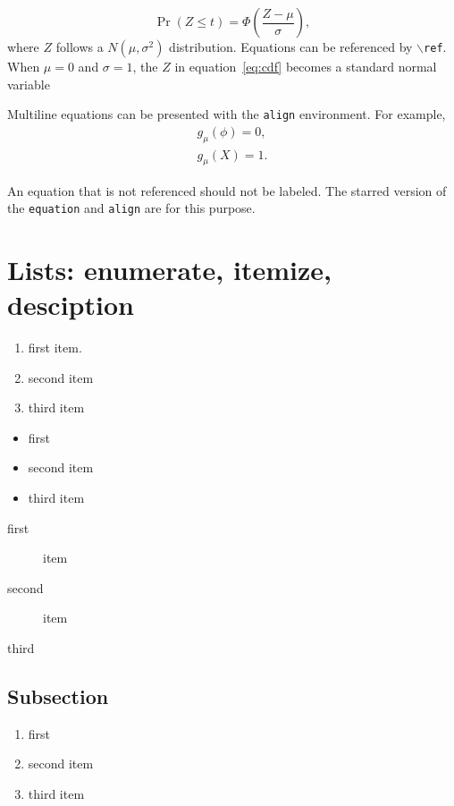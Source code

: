 \documentclass{frbaart}
\begin{document}
\begin{equation}
  \label{eq:cdf}
  \Pr(Z \le t) = \Phi\left(\frac{Z - \mu}{\sigma} \right),
\end{equation}
where $Z$ follows a $N(\mu, \sigma^2)$ distribution.
Equations can be referenced by \texttt{$\backslash$ref}.
When $\mu = 0$ and $\sigma = 1$, the $Z$ in equation~\ref{eq:cdf}
becomes a standard normal variable


Multiline equations can be presented with the \texttt{align}
environment. For example,
\begin{align}
  g_{\mu}(\phi) = 0,\\
  g_{\mu}(X) = 1.
\end{align}


An equation that is not referenced should not be labeled. The starred
version of the \texttt{equation} and \texttt{align} are for this purpose.


\section{Lists: enumerate, itemize, desciption}

\begin{enumerate}
\item first item.
  \lipsum[3][1-4]
\item second item
\item third item
\end{enumerate}

\begin{itemize}
\item first
    \lipsum[3][1-4]
\item second item
\item third item
\end{itemize}


\begin{description}
\item[first] item
\item[second] item
\item[third]
  \lipsum[3][1-4]
\end{description}

\subsection{Subsection}

\lipsum[1][1-3]

\begin{enumerate}
  \item first    \lipsum[3][1-4]
  \item second item
  \item third item
\end{enumerate}
\end{document}
